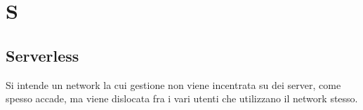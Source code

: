 \section*{S}
\markright{}
\subsection*{Serverless}
Si intende un network la cui gestione non viene incentrata su dei server, come spesso accade, ma viene dislocata fra i vari utenti che utilizzano il network stesso.